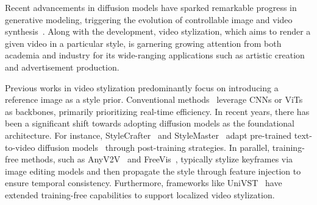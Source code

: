 \documentclass[runningheads]{llncs}
\begin{document}
Recent advancements in diffusion models have sparked remarkable progress in generative modeling, triggering the evolution of controllable image and video synthesis~\cite{he2024id,wang2026customvideo,wan-animi,stableanimator,animateany,wang2026echoshot,yang2025echomotion,li2025ld}.
Along with the development, video stylization, which aims to render a given video in a particular style, is garnering growing attention from both academia and industry for its wide-ranging applications such as artistic creation and advertisement production.

Previous works in video stylization predominantly focus on introducing a reference image as a style prior.
Conventional methods~\cite{gao2018reconet,adain,ghiasi2017exploring,shekhar2023interactive} leverage CNNs or ViTs as backbones, primarily prioritizing real-time efficiency. In recent years, there has been a significant shift towards adopting diffusion models as the foundational architecture. For instance, StyleCrafter~\cite{liu2023stylecrafter} and StyleMaster~\cite{ye2025stylemaster} adapt pre-trained text-to-video diffusion models~\cite{lvdm,wan2025wan} through post-training strategies. In parallel, training-free methods, such as AnyV2V~\cite{kuanyv2v} and FreeVis~\cite{xu2025freevis}, typically stylize keyframes via image editing models and then propagate the style through feature injection to ensure temporal consistency. Furthermore, frameworks like UniVST~\cite{song2025univst} have extended training-free capabilities to support localized video stylization.
\end{document}
